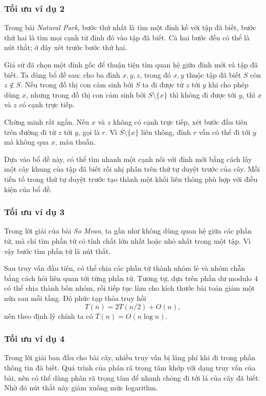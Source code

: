\documentclass[11pt]{article}
\begin{document}
\subsubsection{Tối ưu ví dụ 2}

Trong bài \emph{Natural Park}, bước thứ nhất là tìm một đỉnh kề với tập đã
biết, bước thứ hai là tìm mọi cạnh từ đỉnh đó vào tập đã biết. Cả hai bước đều
có thể là nút thắt; ở đây xét trước bước thứ hai.

Giả sử đã chọn một đỉnh gốc để thuận tiện tìm quan hệ giữa đỉnh mới và tập đã
biết. Ta dùng bổ đề sau: cho ba đỉnh $x,y,z$, trong đó $x,y$ thuộc tập đã biết
$S$ còn $z\notin S$. Nếu trong đồ thị con cảm sinh bởi $S$ ta đi được từ $z$
tới $y$ khi cho phép dùng $x$, nhưng trong đồ thị con cảm sinh bởi
$S\setminus\{x\}$ thì không đi được tới $y$, thì $x$ và $z$ có cạnh trực tiếp.

Chứng minh rất ngắn. Nếu $x$ và $z$ không có cạnh trực tiếp, xét bước đầu tiên
trên đường đi từ $z$ tới $y$, gọi là $r$. Vì $S\setminus\{x\}$ liên thông, đỉnh
$r$ vẫn có thể đi tới $y$ mà không qua $x$, mâu thuẫn.

Dựa vào bổ đề này, có thể tìm nhanh một cạnh nối với đỉnh mới bằng cách lấy một
cây khung của tập đã biết rồi nhị phân trên thứ tự duyệt trước của cây. Mỗi
tiền tố trong thứ tự duyệt trước tạo thành một khối liên thông phù hợp với điều
kiện của bổ đề.

\subsubsection{Tối ưu ví dụ 3}

Trong lời giải của bài \emph{So Mean}, ta gần như không dùng quan hệ giữa các
phần tử, mà chỉ tìm phần tử có tính chất lớn nhất hoặc nhỏ nhất trong một tập.
Vì vậy bước tìm phần tử là nút thắt.

Sau truy vấn đầu tiên, có thể chia các phần tử thành nhóm lẻ và nhóm chẵn bằng
cách hỏi liên quan tới từng phần tử. Tương tự, dựa trên phần dư modulo $4$ có
thể chia thành bốn nhóm, rồi tiếp tục làm cho kích thước bài toán giảm một nửa
sau mỗi tầng. Độ phức tạp thỏa truy hồi
\[
  T(n)=2T(n/2)+O(n),
\]
nên theo định lý chính ta có $T(n)=O(n\log n)$.

\subsubsection{Tối ưu ví dụ 4}

Trong lời giải ban đầu cho bài cây, nhiều truy vấn bị lãng phí khi đi trong
phần thông tin đã biết. Quá trình của phân rã trọng tâm khớp với dạng truy vấn
của bài, nên có thể dùng phân rã trọng tâm để nhanh chóng đi tới lá của cây đã
biết. Nhờ đó nút thắt này giảm xuống mức logarithm.
\end{document}
